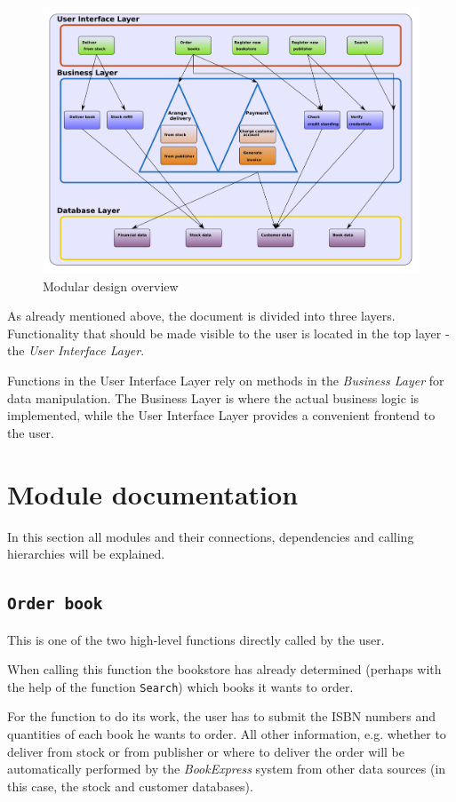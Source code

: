 \begin{figure}[H]
\centering
\includegraphics[scale=0.75,angle=270]{Modular_design.png}
\caption{Modular design overview}
\end{figure}

As already mentioned above, the document is divided into three layers. Functionality that should be made visible to the user is located in the top layer - the \emph{User Interface Layer}.

Functions in the User Interface Layer rely on methods in the \emph{Business Layer} for data manipulation. The Business Layer is where the actual business logic is implemented, while the User Interface Layer provides a convenient frontend to the user.
\chapter{Module documentation}
In this section all modules and their connections, dependencies and calling hierarchies will be explained.

\section{\texttt{Order book}}
This is one of the two high-level functions directly called by the user.

When calling this function the bookstore has already determined (perhaps with the help of the function \texttt{Search})
which books it wants to order.

For the function to do its work, the user has to submit the ISBN numbers and quantities of each book he wants to order.
All other information, e.g. whether to deliver from stock or from publisher or where to deliver the order will be automatically
performed by the \emph{BookExpress} system from other data sources (in this case, the stock and customer databases).

